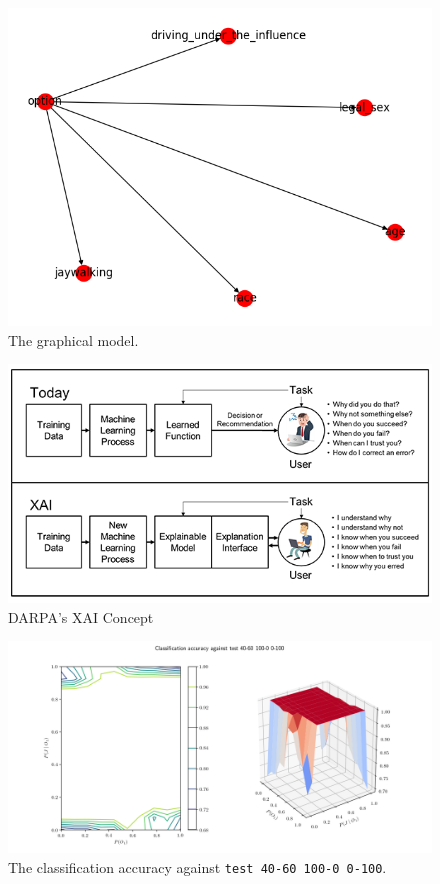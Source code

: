 \documentclass{report}
\newcommand{\code}{\texttt}
\begin{document}
\begin{figure}[h]
    \centering
    \includegraphics[scale=0.6]{figures/network.png}
    \caption[]{The graphical model.}
    \label{fig:graphical_model_image}
\end{figure}

\begin{figure}[h]
    \centering
    \includegraphics[scale=1.1]{figures/xai-figure2.png}
    \caption[]{DARPA's XAI Concept~\protect\cite{gunningXAIProgram}}
    \label{fig:darpa_xai}
\end{figure}

% 
% 

\begin{figure}[h]
    \centering
    \centerline{\includegraphics[scale=0.55]{test_40-60_100-0_0-100_accuracy.png}}
    \caption[]{The classification accuracy against \code{test 40-60 100-0 0-100}.}
    \label{fig:test_40-60_100-0_0-100_accuracy_plot}
\end{figure}
\end{document}
